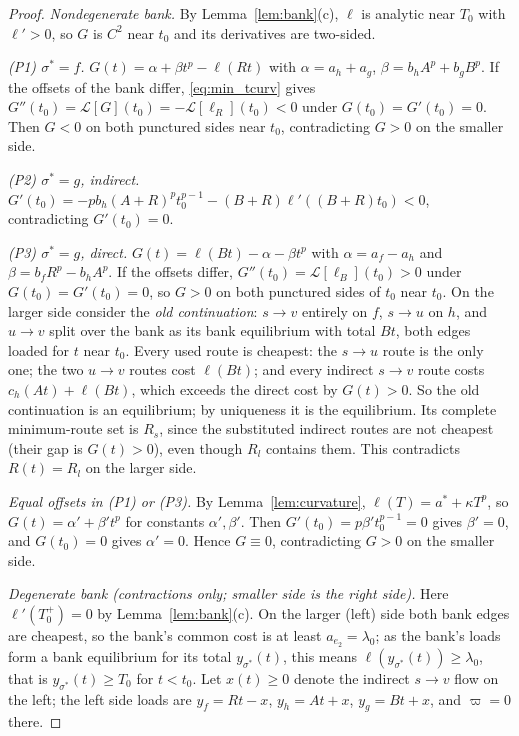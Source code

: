 \begin{proof}
\emph{Nondegenerate bank.} By Lemma~\ref{lem:bank}(c), $\ell$ is analytic
near $T_0$ with $\ell'>0$, so $G$ is $C^2$ near $t_0$ and its derivatives
are two-sided.

\smallskip\noindent
\emph{(P1) $\sigma^*=f$.} $G(t)=\alpha+\beta t^p-\ell(Rt)$ with
$\alpha=a_h+a_g$, $\beta=b_hA^p+b_gB^p$. If the offsets of the bank differ,
\eqref{eq:min_tcurv} gives $G''(t_0)=\mathcal L[G](t_0)=-\mathcal
L[\ell_R](t_0)<0$ under $G(t_0)=G'(t_0)=0$. Then $G<0$ on both punctured sides
near $t_0$, contradicting $G>0$ on the smaller side.

\smallskip\noindent
\emph{(P2) $\sigma^*=g$, indirect.}
$G'(t_0)=-pb_h(A+R)^pt_0^{p-1}-(B+R)\ell'((B+R)t_0)<0$, contradicting
$G'(t_0)=0$.

\smallskip\noindent
\emph{(P3) $\sigma^*=g$, direct.} $G(t)=\ell(Bt)-\alpha-\beta t^p$ with
$\alpha=a_f-a_h$ and $\beta=b_fR^p-b_hA^p$. If the offsets differ,
$G''(t_0)=\mathcal L[\ell_B](t_0)>0$ under $G(t_0)=G'(t_0)=0$, so $G>0$ on both
punctured sides of $t_0$ near $t_0$. On the larger side consider the
\emph{old continuation}: $s\to v$ entirely on $f$, $s\to u$ on $h$, and
$u\to v$ split over the bank as its bank equilibrium with total $Bt$, both
edges loaded for $t$ near $t_0$. Every used route is cheapest: the $s\to u$
route is the only one; the two $u\to v$ routes cost $\ell(Bt)$; and every
indirect $s\to v$ route costs $c_h(At)+\ell(Bt)$, which exceeds the direct cost
by $G(t)>0$. So the old continuation is an equilibrium; by uniqueness it is
the equilibrium. Its complete minimum-route set is $R_s$, since the
substituted indirect routes are not cheapest (their gap is $G(t)>0$), even
though $R_l$ contains them. This contradicts $R(t)=R_l$ on the larger side.

\smallskip\noindent
\emph{Equal offsets in (P1) or (P3).} By Lemma~\ref{lem:curvature},
$\ell(T)=a^*+\kappa T^p$, so $G(t)=\alpha'+\beta't^p$ for constants
$\alpha',\beta'$. Then $G'(t_0)=p\beta't_0^{p-1}=0$ gives $\beta'=0$, and
$G(t_0)=0$ gives $\alpha'=0$. Hence $G\equiv0$, contradicting $G>0$ on the
smaller side.

\smallskip\noindent
\emph{Degenerate bank (contractions only; smaller side is the right side).}
Here $\ell'(T_0^+)=0$ by Lemma~\ref{lem:bank}(c). On the larger (left) side
both bank edges are cheapest, so the bank's common cost is at least
$a_{e_2}=\lambda_0$; as the bank's loads form a bank equilibrium for its total
$y_{\sigma^*}(t)$, this means $\ell(y_{\sigma^*}(t))\ge\lambda_0$, that is
$y_{\sigma^*}(t)\ge T_0$ for $t<t_0$. Let $x(t)\ge0$ denote the indirect
$s\to v$ flow on the left; the left side loads are $y_f=Rt-x$, $y_h=At+x$,
$y_g=Bt+x$, and $\varpi=0$ there.


\end{proof}

